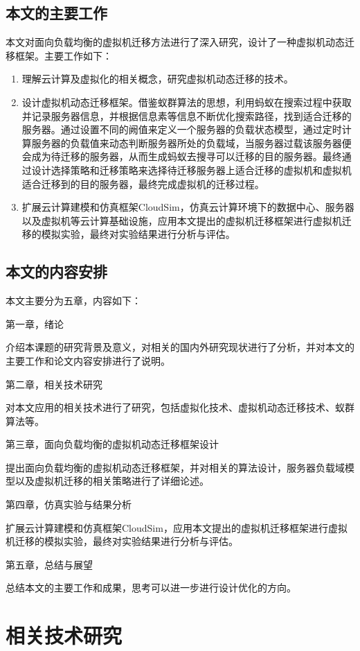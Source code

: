 \section{本文的主要工作}
本文对面向负载均衡的虚拟机迁移方法进行了深入研究，设计了一种虚拟机动态迁移框架。主要工作如下：
\begin{enumerate}
    \item 理解云计算及虚拟化的相关概念，研究虚拟机动态迁移的技术。
    \item 设计虚拟机动态迁移框架。借鉴蚁群算法的思想，利用蚂蚁在搜索过程中获取并记录服务器信息，并根据信息素等信息不断优化搜索路径，找到适合迁移的服务器。通过设置不同的阙值来定义一个服务器的负载状态模型，通过定时计算服务器的负载值来动态判断服务器所处的负载域，当服务器过载该服务器便会成为待迁移的服务器，从而生成蚂蚁去搜寻可以迁移的目的服务器。最终通过设计选择策略和迁移策略来选择待迁移服务器上适合迁移的虚拟机和虚拟机适合迁移到的目的服务器，最终完成虚拟机的迁移过程。
    \item 扩展云计算建模和仿真框架CloudSim，仿真云计算环境下的数据中心、服务器以及虚拟机等云计算基础设施，应用本文提出的虚拟机迁移框架进行虚拟机迁移的模拟实验，最终对实验结果进行分析与评估。
\end{enumerate}

\section{本文的内容安排}
本文主要分为五章，内容如下：

第一章，绪论

介绍本课题的研究背景及意义，对相关的国内外研究现状进行了分析，并对本文的主要工作和论文内容安排进行了说明。

第二章，相关技术研究

对本文应用的相关技术进行了研究，包括虚拟化技术、虚拟机动态迁移技术、蚁群算法等。

第三章，面向负载均衡的虚拟机动态迁移框架设计

提出面向负载均衡的虚拟机动态迁移框架，并对相关的算法设计，服务器负载域模型以及虚拟机迁移的相关策略进行了详细论述。

第四章，仿真实验与结果分析

扩展云计算建模和仿真框架CloudSim，应用本文提出的虚拟机迁移框架进行虚拟机迁移的模拟实验，最终对实验结果进行分析与评估。

第五章，总结与展望

总结本文的主要工作和成果，思考可以进一步进行设计优化的方向。

\chapter{相关技术研究}

